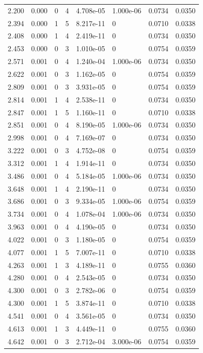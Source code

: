 \documentclass[preview]{standalone}
\begin{document}
{{\begin{tabular}{L{1.2cm}C{1.2cm} C{0.3cm}C{0.5cm} C{1.4cm}C{1.4cm} C{1.4cm}C{1.4cm}}
  2.200  &  0.000  & 0     &  4 &  4.708e-05  & 1.000e-06  & 0.0734 &  0.0350   \\ 
  2.394  &  0.000  & 1     &  5 &  8.217e-11  & 0  & 0.0710 &  0.0338   \\ 
  2.408  &  0.000  & 1     &  4 &  2.419e-11  & 0  & 0.0734 &  0.0350   \\ 
  2.453  &  0.000  & 0     &  3 &  1.010e-05  & 0  & 0.0754 &  0.0359   \\ 
  2.571  &  0.001  & 0     &  4 &  1.240e-04  & 1.000e-06  & 0.0734 &  0.0350   \\ 
  2.622  &  0.001  & 0     &  3 &  1.162e-05  & 0  & 0.0754 &  0.0359   \\ 
  2.809  &  0.001  & 0     &  3 &  3.931e-05  & 0  & 0.0754 &  0.0359   \\ 
  2.814  &  0.001  & 1     &  4 &  2.538e-11  & 0  & 0.0734 &  0.0350   \\ 
  2.847  &  0.001  & 1     &  5 &  1.160e-11  & 0  & 0.0710 &  0.0338   \\ 
  2.851  &  0.001  & 0     &  4 &  8.190e-05  & 1.000e-06  & 0.0734 &  0.0350   \\ 
  2.998  &  0.001  & 0     &  4 &  7.169e-07  & 0  & 0.0734 &  0.0350   \\ 
  3.222  &  0.001  & 0     &  3 &  4.752e-08  & 0  & 0.0754 &  0.0359   \\ 
  3.312  &  0.001  & 1     &  4 &  1.914e-11  & 0  & 0.0734 &  0.0350   \\ 
  3.486  &  0.001  & 0     &  4 &  5.184e-05  & 1.000e-06  & 0.0734 &  0.0350   \\ 
  3.648  &  0.001  & 1     &  4 &  2.190e-11  & 0  & 0.0734 &  0.0350   \\ 
  3.686  &  0.001  & 0     &  3 &  9.334e-05  & 1.000e-06  & 0.0754 &  0.0359   \\ 
  3.734  &  0.001  & 0     &  4 &  1.078e-04  & 1.000e-06  & 0.0734 &  0.0350   \\ 
  3.963  &  0.001  & 0     &  4 &  4.190e-05  & 0  & 0.0734 &  0.0350   \\ 
  4.022  &  0.001  & 0     &  3 &  1.180e-05  & 0  & 0.0754 &  0.0359   \\ 
  4.077  &  0.001  & 1     &  5 &  7.007e-11  & 0  & 0.0710 &  0.0338   \\ 
  4.263  &  0.001  & 1     &  3 &  4.189e-11  & 0  & 0.0755 &  0.0360   \\ 
  4.280  &  0.001  & 0     &  4 &  2.543e-05  & 0  & 0.0734 &  0.0350   \\ 
  4.300  &  0.001  & 0     &  3 &  2.782e-06  & 0  & 0.0754 &  0.0359   \\ 
  4.300  &  0.001  & 1     &  5 &  3.874e-11  & 0  & 0.0710 &  0.0338   \\ 
  4.541  &  0.001  & 0     &  4 &  3.561e-05  & 0  & 0.0734 &  0.0350   \\ 
  4.613  &  0.001  & 1     &  3 &  4.449e-11  & 0  & 0.0755 &  0.0360   \\ 
  4.642  &  0.001  & 0     &  3 &  2.712e-04  & 3.000e-06  & 0.0754 &  0.0359   \\ 
\hline 
\end{tabular} 

}}
\end{document}
